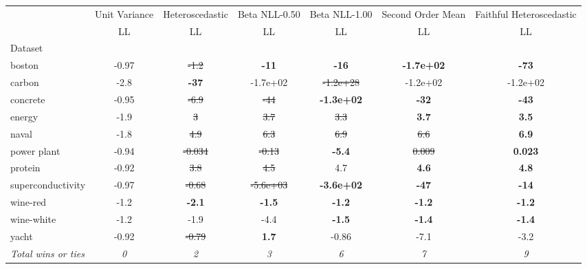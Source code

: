\begin{tabular}{l|c|c|c|c|c|c}
\toprule
{} & {Unit Variance} & {Heteroscedastic} & {Beta NLL-0.50} & {Beta NLL-1.00} & {Second Order Mean} & {Faithful Heteroscedastic} \\
{} & {LL} & {LL} & {LL} & {LL} & {LL} & {LL} \\
{Dataset} & {} & {} & {} & {} & {} & {} \\
\midrule
boston & -0.97 & \sout{-1.2} & \textbf{-11} & \textbf{-16} & \textbf{-1.7e+02} & \textbf{-73} \\
carbon & -2.8 & \textbf{-37} & -1.7e+02 & \sout{-1.2e+28} & -1.2e+02 & -1.2e+02 \\
concrete & -0.95 & \sout{-6.9} & \sout{-44} & \textbf{-1.3e+02} & \textbf{-32} & \textbf{-43} \\
energy & -1.9 & \sout{3} & \sout{3.7} & \sout{3.3} & \textbf{3.7} & \textbf{3.5} \\
naval & -1.8 & \sout{4.9} & \sout{6.3} & \sout{6.9} & \sout{6.6} & \textbf{6.9} \\
power plant & -0.94 & \sout{-0.034} & \sout{-0.13} & \textbf{-5.4} & \sout{0.009} & \textbf{0.023} \\
protein & -0.92 & \sout{3.8} & \sout{4.5} & 4.7 & \textbf{4.6} & \textbf{4.8} \\
superconductivity & -0.97 & \sout{-0.68} & \sout{-5.6e+03} & \textbf{-3.6e+02} & \textbf{-47} & \textbf{-14} \\
wine-red & -1.2 & \textbf{-2.1} & \textbf{-1.5} & \textbf{-1.2} & \textbf{-1.2} & \textbf{-1.2} \\
wine-white & -1.2 & -1.9 & -4.4 & \textbf{-1.5} & \textbf{-1.4} & \textbf{-1.4} \\
yacht & -0.92 & \sout{-0.79} & \textbf{1.7} & -0.86 & -7.1 & -3.2 \\
\textit{{Total wins or ties}} & \textit{0} & \textit{2} & \textit{3} & \textit{6} & \textit{7} & \textit{9} \\
\bottomrule
\end{tabular}
